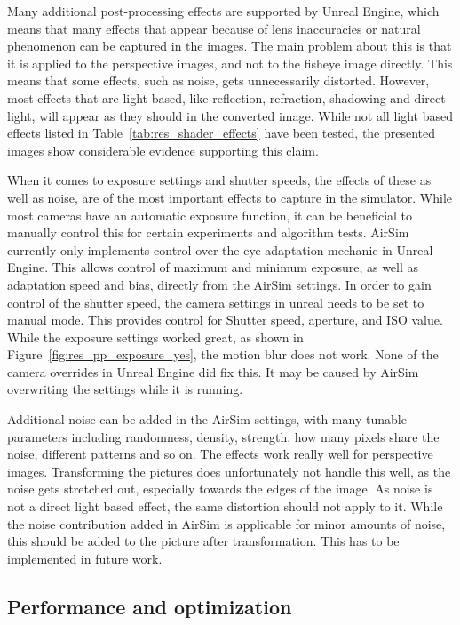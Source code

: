 Many additional post-processing effects are supported by Unreal Engine, which means that many effects that appear because of lens inaccuracies or natural phenomenon can be captured in the images. The main problem about this is that it is applied to the perspective images, and not to the fisheye image directly. This means that some effects, such as noise, gets unnecessarily distorted. However, most effects that are light-based, like reflection, refraction, shadowing and direct light, will appear as they should in the converted image. While not all light based effects listed in Table~\ref{tab:res_shader_effects} have been tested, the presented images show considerable evidence supporting this claim.

When it comes to exposure settings and shutter speeds, the effects of these as well as noise, are of the most important effects to capture in the simulator. While most cameras have an automatic exposure function, it can be beneficial to manually control this for certain experiments and algorithm tests. AirSim currently only implements control over the eye adaptation mechanic in Unreal Engine. This allows control of maximum and minimum exposure, as well as adaptation speed and bias, directly from the AirSim settings. In order to gain control of the shutter speed, the camera settings in unreal needs to be set to manual mode. This provides control for Shutter speed, aperture, and ISO value. While the exposure settings worked great, as shown in Figure~\ref{fig:res_pp_exposure_yes}, the motion blur does not work. None of the camera overrides in Unreal Engine did fix this. It may be caused by AirSim overwriting the settings while it is running.

Additional noise can be added in the AirSim settings, with many tunable parameters including randomness, density, strength, how many pixels share the noise, different patterns and so on. The effects work really well for perspective images. Transforming the pictures does unfortunately not handle this well, as the noise gets stretched out, especially towards the edges of the image. As noise is not a direct light based effect, the same distortion should not apply to it. While the noise contribution added in AirSim is applicable for minor amounts of noise, this should be added to the picture after transformation. This has to be implemented in future work.

\subsection{Performance and optimization} \label{sec:disc_performance}

